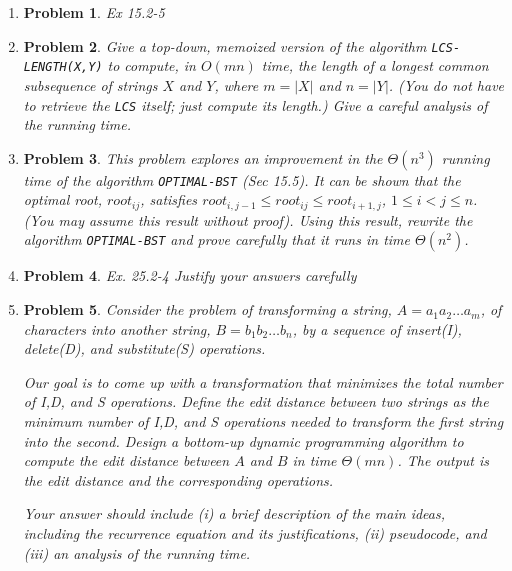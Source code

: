 \documentclass[a4paper]{article}
\newtheorem*{problem}{Problem}
\begin{document}
\begin{enumerate}
  \item
    \begin{problem} Ex 15.2-5
    \end{problem}

  \item
    \begin{problem}
      Give a top-down, memoized version of the algorithm \texttt{LCS-LENGTH(X,Y)} to compute, in $O(mn)$ time, the length of a longest common
      subsequence of strings $X$ and $Y$, where $m=|X|$ and $n=|Y|$. (You do not have to retrieve the \texttt{LCS} itself; just compute its length.)
      Give a careful analysis of the running time.
    \end{problem}

  \item
    \begin{problem}
      This problem explores an improvement in the $\Theta(n^3)$ running time of the algorithm \texttt{OPTIMAL-BST} (Sec 15.5). It can be shown that
      the optimal root, $root_{ij}$, satisfies $root_{i,j-1} \leq root_{ij} \leq root_{i+1,j}$, $1 \leq i < j \leq n$. (You may assume this result
      without proof). Using this result, rewrite the algorithm \texttt{OPTIMAL-BST} and prove carefully that it runs in time $\Theta(n^2)$.
    \end{problem}

  \item
    \begin{problem}
      Ex. 25.2-4 Justify your answers carefully
    \end{problem}

  \item
    \begin{problem}

      Consider the problem of transforming a string, $A = a_1 a_2 \dots a_m$, of characters into another string, $B=b_1 b_2 \dots b_n$, by a sequence
      of insert(I), delete(D), and substitute(S) operations.

      Our goal is to come up with a transformation that minimizes the total number of I,D, and S operations. Define the edit distance between two
      strings as the minimum number of I,D, and S operations needed to transform the first string into the second. Design a bottom-up dynamic
      programming algorithm to compute the edit distance between $A$ and $B$ in time $\Theta(mn)$. The output is the edit distance and the
      corresponding operations.

      Your answer should include (i) a brief description of the main ideas, including the recurrence equation and its justifications, (ii) pseudocode,
      and (iii) an analysis of the running time.


\end{problem}
\end{enumerate}
\end{document}
